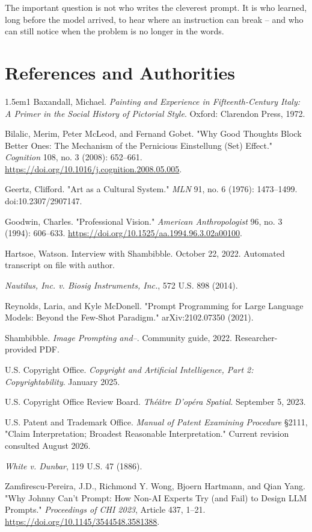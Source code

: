 \documentclass[11pt]{article}
\begin{document}
The important question is not who writes the cleverest prompt. It is who learned, long before the model arrived, to hear where an instruction can break -- and who can still notice when the problem is no longer in the words.

\section*{References and Authorities}
\begingroup
\footnotesize
\setlength{\parskip}{0.18em}
\begin{hangparas}{1.5em}{1}
Baxandall, Michael. \textit{Painting and Experience in Fifteenth-Century Italy: A Primer in the Social History of Pictorial Style}. Oxford: Clarendon Press, 1972.

Bilalic, Merim, Peter McLeod, and Fernand Gobet. "Why Good Thoughts Block Better Ones: The Mechanism of the Pernicious Einstellung (Set) Effect." \textit{Cognition} 108, no. 3 (2008): 652--661. \url{https://doi.org/10.1016/j.cognition.2008.05.005}.

Geertz, Clifford. "Art as a Cultural System." \textit{MLN} 91, no. 6 (1976): 1473--1499. doi:10.2307/2907147.

Goodwin, Charles. "Professional Vision." \textit{American Anthropologist} 96, no. 3 (1994): 606--633. \url{https://doi.org/10.1525/aa.1994.96.3.02a00100}.

Hartsoe, Watson. Interview with Shambibble. October 22, 2022. Automated transcript on file with author.

\textit{Nautilus, Inc. v. Biosig Instruments, Inc.}, 572 U.S. 898 (2014).

Reynolds, Laria, and Kyle McDonell. "Prompt Programming for Large Language Models: Beyond the Few-Shot Paradigm." arXiv:2102.07350 (2021).

Shambibble. \textit{Image Prompting and--}. Community guide, 2022. Researcher-provided PDF.

U.S. Copyright Office. \textit{Copyright and Artificial Intelligence, Part 2: Copyrightability}. January 2025.

U.S. Copyright Office Review Board. \textit{Th\'e\^atre D'op\'era Spatial}. September 5, 2023.

U.S. Patent and Trademark Office. \textit{Manual of Patent Examining Procedure} \S 2111, "Claim Interpretation; Broadest Reasonable Interpretation." Current revision consulted August 2026.

\textit{White v. Dunbar}, 119 U.S. 47 (1886).

Zamfirescu-Pereira, J.D., Richmond Y. Wong, Bjoern Hartmann, and Qian Yang. "Why Johnny Can't Prompt: How Non-AI Experts Try (and Fail) to Design LLM Prompts." \textit{Proceedings of CHI 2023}, Article 437, 1--21. \url{https://doi.org/10.1145/3544548.3581388}.
\end{hangparas}
\endgroup
\end{document}
